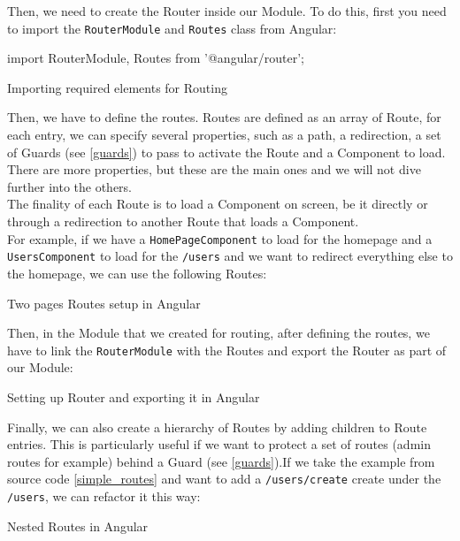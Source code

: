 \documentclass[twoside, openright,11pt,a4paper]{book}
\newenvironment{code}{\captionsetup{type=listing}}{}
\begin{document}
Then, we need to create the Router inside our Module. To do this, first you need to import the \verb+RouterModule+ and \verb+Routes+ class from Angular:
\begin{code}
	\begin{inlinets}
import { RouterModule, Routes } from '@angular/router';
	\end{inlinets}
	\caption{Importing required elements for Routing}
\end{code}

Then, we have to define the routes. Routes are defined as an array of Route, for each entry, we can specify several properties, such as a path, a redirection, a set of Guards (see \ref{guards}) to pass to activate the Route and a Component to load. There are more properties, but these are the main ones and we will not dive further into the others. \\

The finality of each Route is to load a Component on screen, be it directly or through a redirection to another Route that loads a Component. \\

For example, if we have a \verb+HomePageComponent+ to load for the homepage and a \verb+UsersComponent+ to load for the \verb+/users+ and we want to redirect everything else to the homepage, we can use the following Routes:
\begin{code}
	\caption{Two pages Routes setup in Angular}
	\label{simple_routes}
\end{code}

Then, in the Module that we created for routing, after defining the routes, we have to link the \verb+RouterModule+ with the Routes and export the Router as part of our Module:
\begin{code}
	\caption{Setting up Router and exporting it in Angular}
\end{code}

Finally, we can also create a hierarchy of Routes by adding children to Route entries. This is particularly useful if we want to protect a set of routes (admin routes for example) behind a Guard (see \ref{guards}).If we take the example from source code \ref{simple_routes} and want to add a \verb+/users/create+ create under the \verb+/users+, we can refactor it this way:
\begin{code}
	\caption{Nested Routes in Angular}
	\label{nested_routes}
\end{code}
\end{document}

